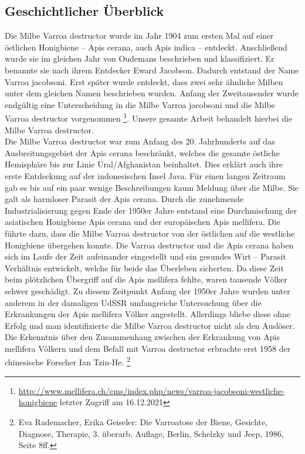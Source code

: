 \documentclass[11pt,a4paper]{article}
\begin{document}
\subsection{Geschichtlicher Überblick}
Die Milbe Varroa destructor wurde im Jahr 1904 zum ersten Mal auf einer östlichen Honigbiene – Apis cerana, auch Apis indica – entdeckt. Anschließend wurde sie im gleichen Jahr von Oudemans beschrieben und klassifiziert. Er benannte sie nach ihrem Entdecker Eward Jacobson. Dadurch entstand der Name Varroa jacobsoni. Erst später wurde entdeckt, dass zwei sehr ähnliche Milben unter dem gleichen Namen beschrieben wurden. Anfang der Zweitausender wurde endgültig eine Unterscheidung in die Milbe Varroa jacobsoni und die Milbe Varroa destructor vorgenommen \footnote{\url{http://www.mellifera.ch/cms/index.php/news/varroa-jacobsoni-westliche-honigbiene} letzter Zugriff am 16.12.2021}. Unsere gesamte Arbeit behandelt hierbei die Milbe Varroa destructor. \\
Die Milbe Varroa destructor war zum Anfang des 20. Jahrhunderts auf das Ausbreitungsgebiet der Apis cerana beschränkt, welches die gesamte östliche Hemisphäre bis zur Linie Ural/Afghanistan beinhaltet. Dies erklärt auch ihre erste Entdeckung auf der indonesischen Insel Java. Für einen langen Zeitraum gab es bis auf ein paar wenige Beschreibungen kaum Meldung über die Milbe. Sie galt als harmloser Parasit der Apis cerana. 
Durch die zunehmende Industrialisierung gegen Ende der 1950er Jahre entstand eine Durchmischung der asiatischen Honigbiene Apis cerana und der europäischen Apis mellifera. Die führte dazu, dass die Milbe Varroa destructor von der östlichen auf die westliche Honigbiene übergehen konnte. Die Varroa destructor und die Apis cerana haben sich im Laufe der Zeit aufeinander eingestellt und ein gesundes Wirt – Parasit Verhältnis entwickelt, welche für beide das Überleben sicherten. Da diese Zeit beim plötzlichen Übergriff auf die Apis mellifera fehlte, waren tausende Völker schwer geschädigt. Zu diesem Zeitpunkt Anfang der 1950er Jahre wurden unter anderem in der damaligen UdSSR umfangreiche Untersuchung über die Erkrankungen der Apis mellifera Völker angestellt. Allerdings bliebe diese ohne Erfolg und man identifizierte die Milbe Varroa destructor nicht als den Auslöser. Die Erkenntnis über den Zusammenhang zwischen der Erkrankung von Apis mellifera Völkern und dem Befall mit Varroa destructor erbrachte erst 1958 der chinesische Forscher Ian Tzin-He. \footnote{Eva Rademacher, Erika Geiseler: Die Varroatose der Biene, Gesichte, Diagnose, Therapie, 3. überarb. Auflage, Berlin, Schelzky und Jeep, 1986, Seite 8ff.}
\end{document}
